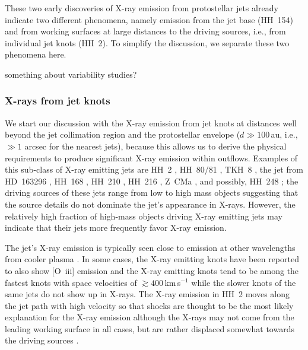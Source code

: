 These two early discoveries of X-ray emission  from protostellar jets already indicate two different phenomena, namely emission from the jet base (HH~154) and from working surfaces at large distances to the driving sources, i.e., from individual jet knots (HH~2). To simplify the discussion, we separate these two phenomena here.

{\color{red} something about variability studies?}

\subsubsection{X-rays from jet knots}

We start our discussion with the X-ray emission from jet knots at distances well beyond the jet collimation region and the protostellar envelope ($d\gg100\,$au, i.e., $\gg1$ arcsec for the nearest jets), because this allows us to derive the physical requirements to produce significant X-ray emission within outflows. Examples of this sub-class of X-ray emitting jets are HH~2 \citep{Pravdo_2001}, HH~80/81 \citep{Pravdo_2004}, TKH~8 \citep{Tsujimoto_2004}, the jet from HD~163296 \citep[HH~409, see ][]{Swartz_2005,Guenther_2013},   HH~168 \citep{Pravdo_2005,Schneider_2009}, HH~210 \citep{Grosso_2006}, HH~216 \citep{Linsky_2007}, Z~CMa \citep{Stelzer_2009}, and possibly, HH~248 \citep{Lopez_2015}; the driving sources of these jets range from low to high mass objects suggesting that 
the source details do not dominate the jet's appearance in X-rays. However, the relatively high fraction of high-mass objects driving X-ray emitting jets may indicate that their jets more frequently favor X-ray emission. 


The jet's X-ray emission is typically seen close to emission at other wavelengths from cooler plasma   \citep[$T\sim10^4$\,K, e.g.,][]{Pravdo_2004,Grosso_2006,Schneider_2012}.  In some cases, the X-ray emitting knots have been reported to also show [O~{\sc iii}] emission \citep[$T\sim10^5$\,K, see ][]{Grosso_2006}  and the X-ray emitting knots tend to be among the fastest knots with space velocities of $\gtrsim400$\,km\,s$^{-1}$ \citep[e.g.,][]{Pravdo_2001} while the slower knots of the same jets do not show up in X-rays. The X-ray emission in HH~2  moves along the jet path with high velocity \citep{Schneider_2012} so that shocks are thought to be the most likely explanation for the X-ray emission although the X-rays may not come from the leading working surface in all cases, but are rather displaced somewhat towards the driving sources \citep[][]{Pravdo_2005}.

